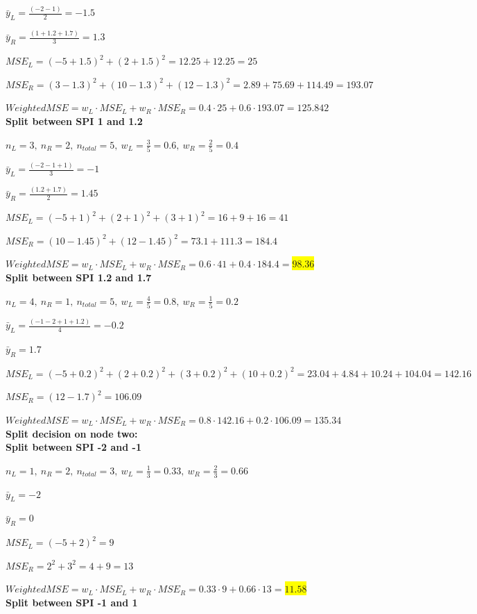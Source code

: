\documentclass{article}
\begin{document}
$\bar{y}_L = \frac{(-2 - 1)}{2} = -1.5$

$\bar{y}_R = \frac{(1 + 1.2 + 1.7)}{3} = 1.3$

$MSE_L = (-5 + 1.5)^2 + (2 + 1.5)^2 = 12.25 + 12.25 = 25$

$MSE_R = (3 - 1.3)^2 + (10 - 1.3)^2 + (12 - 1.3)^2 = 2.89 + 75.69 + 114.49 = 193.07$

$Weighted MSE = w_L \cdot MSE_L + w_R \cdot MSE_R = 0.4 \cdot 25 + 0.6 \cdot 193.07 = 125.842$
\\
\textbf{Split between SPI 1 and 1.2}

$n_L = 3, \ n_R = 2, \ n_{total} = 5, \ w_L = \frac{3}{5} = 0.6, \ w_R = \frac{2}{5} = 0.4$

$\bar{y}_L = \frac{(-2 - 1 + 1)}{3} = -1$

$\bar{y}_R = \frac{(1.2 + 1.7)}{2} = 1.45$

$MSE_L = (-5 + 1)^2 + (2 + 1)^2 + (3 + 1)^2 = 16 + 9 + 16 = 41$

$MSE_R = (10 - 1.45)^2 + (12 - 1.45)^2 = 73.1 + 111.3 = 184.4$

$Weighted MSE = w_L \cdot MSE_L + w_R \cdot MSE_R = 0.6 \cdot 41 + 0.4 \cdot 184.4 =$\colorbox{yellow}{$98.36$}
\\
\textbf{Split between SPI 1.2 and 1.7}

$n_L = 4, \ n_R = 1, \ n_{total} = 5, \ w_L = \frac{4}{5} = 0.8, \ w_R = \frac{1}{5} = 0.2$

$\bar{y}_L = \frac{(-1 - 2 + 1 + 1.2)}{4} = -0.2$

$\bar{y}_R = 1.7$

$MSE_L = (-5 + 0.2)^2 + (2 + 0.2)^2 + (3 + 0.2)^2 + (10 + 0.2)^2 = 23.04 + 4.84 + 10.24 + 104.04 = 142.16$

$MSE_R = (12 - 1.7)^2 = 106.09$

$Weighted MSE = w_L \cdot MSE_L + w_R \cdot MSE_R = 0.8 \cdot 142.16 + 0.2 \cdot 106.09 = 135.34$
\\
\textbf{Split decision on node two:}
\\
\textbf{Split between SPI -2 and -1}

$n_L = 1, \ n_R = 2, \ n_{total} = 3, \ w_L = \frac{1}{3} = 0.33, \ w_R = \frac{2}{3} = 0.66$

$\bar{y}_L = -2$

$\bar{y}_R = 0$

$MSE_L = (-5 + 2)^2 = 9$

$MSE_R = 2^2 + 3^2 = 4 + 9 = 13$

$Weighted MSE = w_L \cdot MSE_L + w_R \cdot MSE_R = 0.33 \cdot 9 + 0.66 \cdot 13 =$\colorbox{yellow}{$11.58$}
\noindent
\\
\textbf{Split between SPI -1 and 1 }
\end{document}

